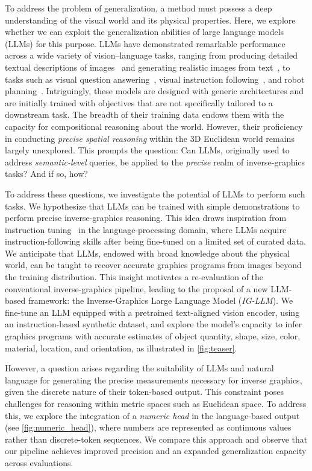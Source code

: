 To address the problem of generalization, a method must possess a deep understanding of the visual world and its physical properties.
Here, we explore whether we can exploit the generalization abilities of large language models (LLMs) for this purpose.
LLMs have demonstrated remarkable performance across a wide variety of vision--language tasks, ranging from producing detailed textual descriptions of images~\citep{Alayrac2022FlamingoAV} and generating realistic images from text~\citep{koh2023generating}, to tasks such as visual question answering~\citep{ouyang2022training,OpenAI2023GPT4TR}, visual instruction following~\citep{liu2023llava,zhu2023minigpt}, and robot planning~\citep{huang2022language,singh2023progprompt}.
Intriguingly, these models are designed with generic architectures and are initially trained with objectives that are not specifically tailored to a downstream task.
The breadth of their training data endows them with the capacity for compositional reasoning about the world.
However, their proficiency in conducting \emph{precise spatial reasoning} within the 3D Euclidean world remains largely unexplored.
This prompts the question:
Can LLMs, originally used to address \textit{semantic-level} queries, be applied to the \textit{precise} realm of inverse-graphics tasks?
And if so, how?

To address these questions, we investigate the potential of LLMs to perform such tasks.
We hypothesize that LLMs can be trained with simple demonstrations to perform precise inverse-graphics reasoning.
This idea draws inspiration from instruction tuning~\citep{alpaca,wei_2024_instruction} in the language-processing domain, where LLMs acquire instruction-following skills after being fine-tuned on a limited set of curated data.
We anticipate that LLMs, endowed with broad knowledge about the physical world, can be taught to recover accurate graphics programs from images beyond the training distribution.
This insight motivates a re-evaluation of the conventional inverse-graphics pipeline, leading to the proposal of a new LLM-based framework: the Inverse-Graphics Large Language Model (\emph{IG-LLM}).
We fine-tune an LLM equipped with a pretrained text-aligned vision encoder, using an instruction-based synthetic dataset, and explore the model's capacity to infer graphics programs with accurate estimates of object quantity, shape, size, color, material, location, and orientation, as illustrated in \cref{fig:teaser}.

However, a question arises regarding the suitability of LLMs and natural language for generating the precise measurements necessary for inverse graphics, given the discrete nature of their token-based output.
This constraint poses challenges for reasoning within metric spaces such as Euclidean space.
To address this, we explore the integration of a \emph{numeric head} in the language-based output (see \cref{fig:numeric_head}), where numbers are represented as continuous values rather than discrete-token sequences.
We compare this approach and observe that our pipeline achieves improved precision and an expanded generalization capacity across evaluations.

